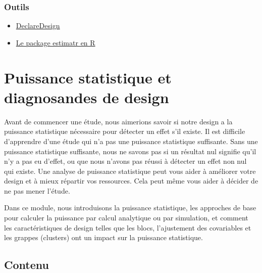 \documentclass[
  12pt,
]{book}
\begin{document}
\hypertarget{outils-2}{%
\subsection{Outils}\label{outils-2}}

\begin{itemize}
\item
  \href{https://declaredesign.org}{DeclareDesign}
\item
  \href{https://declaredesign.org/r/estimatr/}{Le package estimatr en R}
\end{itemize}

\hypertarget{puissance-statistique-et-diagnosandes-de-design}{%
\chapter{Puissance statistique et diagnosandes de design}\label{puissance-statistique-et-diagnosandes-de-design}}

Avant de commencer une étude, nous aimerions savoir si notre design a la puissance statistique nécessaire pour détecter un effet s'il existe. Il est difficile d'apprendre d'une étude qui n'a pas une puissance statistique suffisante. Sans une puissance statistique suffisante, nous ne savons pas si un résultat nul signifie qu'il n'y a pas eu d'effet, ou que nous n'avons pas réussi à détecter un effet non nul qui existe. Une analyse de puissance statistique peut vous aider à améliorer votre design et à mieux répartir vos ressources. Cela peut même vous aider à décider de ne pas mener l'étude.

Dans ce module, nous introduisons la puissance statistique, les approches de base pour calculer la puissance par calcul analytique ou par simulation, et comment les caractéristiques de design telles que les blocs, l'ajustement des covariables et les grappes (clusters) ont un impact sur la puissance statistique.

\hypertarget{contenu-5}{%
\section{Contenu}\label{contenu-5}}
\end{document}
